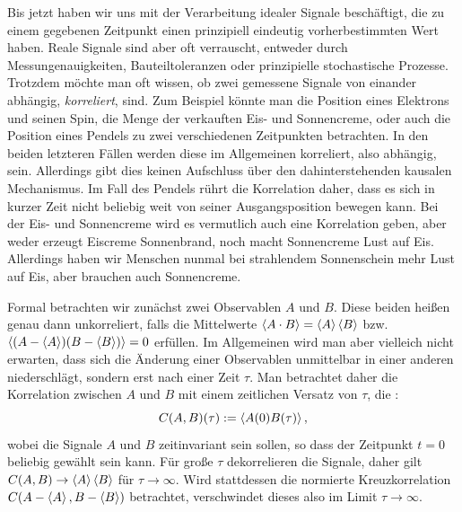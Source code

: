 Bis jetzt haben wir uns mit der Verarbeitung idealer Signale
beschäftigt, die zu einem gegebenen Zeitpunkt einen prinzipiell
eindeutig vorherbestimmten Wert haben.  Reale Signale sind aber oft
verrauscht, entweder durch Messungenauigkeiten, Bauteiltoleranzen oder
prinzipielle stochastische Prozesse.  Trotzdem möchte man oft wissen,
ob zwei gemessene Signale von einander abhängig, \emph{korreliert},
sind. Zum Beispiel könnte man die Position eines Elektrons und seinen
Spin, die Menge der verkauften Eis- und Sonnencreme, oder auch die
Position eines Pendels zu zwei verschiedenen Zeitpunkten betrachten.
In den beiden letzteren Fällen werden diese im Allgemeinen korreliert,
also abhängig, sein. Allerdings gibt dies keinen Aufschluss über den
dahinterstehenden kausalen Mechanismus. Im Fall des Pendels rührt die
Korrelation daher, dass es sich in kurzer Zeit nicht beliebig weit von
seiner Ausgangsposition bewegen kann. Bei der Eis- und Sonnencreme
wird es vermutlich auch eine Korrelation geben, aber weder erzeugt
Eiscreme Sonnenbrand, noch macht Sonnencreme Lust auf Eis. Allerdings
haben wir Menschen nunmal bei strahlendem Sonnenschein mehr Lust auf
Eis, aber brauchen auch Sonnencreme.

Formal betrachten wir zunächst zwei Observablen $A$ und $B$. Diese
beiden heißen genau dann unkorreliert, falls die Mittelwerte
$\left\langle{A\cdot B}\right\rangle = \left\langle{A}\right\rangle\left\langle{B}\right\rangle$
bzw. $\left\langle{(A-\left\langle{A}\right\rangle)(B-\left\langle{B}\right\rangle)}\right\rangle=0$ erfüllen.  Im Allgemeinen
wird man aber vielleich nicht erwarten, dass sich die Änderung einer
Observablen unmittelbar in einer anderen niederschlägt, sondern erst
nach einer Zeit $\tau$.  Man betrachtet daher die Korrelation zwischen
$A$ und $B$ mit einem zeitlichen Versatz von $\tau$, die
\emph{}:
\begin{equation}
  \label{eq:crosscorr}
  C(A,B)(\tau) := \left\langle{A(0)B(\tau)}\right\rangle,
\end{equation}
wobei die Signale $A$ und $B$ zeitinvariant sein sollen, so dass der
Zeitpunkt $t=0$ beliebig gewählt sein kann. Für große $\tau$
dekorrelieren die Signale, daher gilt $C(A,B)\to \left\langle{A}\right\rangle\left\langle{B}\right\rangle$ für
$\tau\to\infty$. Wird stattdessen die normierte Kreuzkorrelation
$C(A-\left\langle{A}\right\rangle, B-\left\langle{B}\right\rangle)$ betrachtet, verschwindet dieses also im
Limit $\tau\to\infty$.

